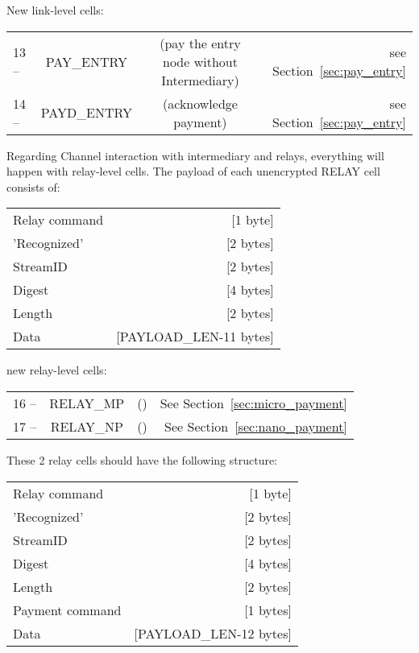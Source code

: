 \documentclass{article}
\begin{document}
New link-level cells:

\begin{center}
\begin{tabular}{l c c r}
13 -- & PAY\_ENTRY & (pay the entry node without Intermediary) & see Section~\ref{sec:pay_entry} \\
14 -- & PAYD\_ENTRY & (acknowledge payment) & see Section~\ref{sec:pay_entry} \\
\end{tabular}
\end{center}

Regarding Channel interaction with intermediary and relays, everything will happen with relay-level cells. The payload of each unencrypted RELAY cell consists of:

\begin{center}
	\begin{tabular}{l r}
	     Relay command       &    [1 byte]\\
         'Recognized'        &    [2 bytes]\\
         StreamID            &    [2 bytes]\\
         Digest              &    [4 bytes]\\
         Length              &    [2 bytes]\\
         Data                &    [PAYLOAD\_LEN-11 bytes]

	\end{tabular}
\end{center}

new relay-level cells:
\begin{center}
	\begin{tabular}{l c c r}
		16 -- & RELAY\_MP & () & See Section~\ref{sec:micro_payment} \\
		17 -- & RELAY\_NP  & () & See Section~\ref{sec:nano_payment}\\
	\end{tabular}
\end{center}

These 2 relay cells should have the following structure:

\begin{center}
	\begin{tabular}{l r}
	     Relay command       &    [1 byte]\\
         'Recognized'        &    [2 bytes]\\
         StreamID            &    [2 bytes]\\
         Digest              &    [4 bytes]\\
         Length              &    [2 bytes]\\
         Payment command     &    [1 bytes] \\
         Data                &    [PAYLOAD\_LEN-12 bytes]

	\end{tabular}
\end{center}
\end{document}
